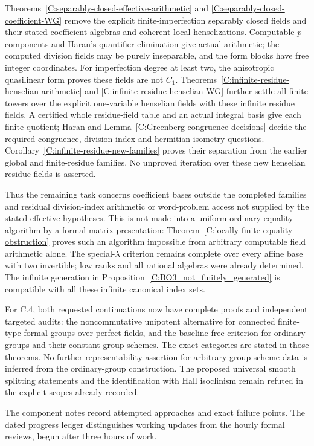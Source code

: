 \begin{remark}
Theorems~\ref{C:separably-closed-effective-arithmetic} and
\ref{C:separably-closed-coefficient-WG} remove the explicit finite-imperfection
separably closed fields and their stated coefficient algebras and
coherent local henselizations. Computable $p$-components and Haran's
quantifier elimination give actual arithmetic; the computed division
fields may be purely inseparable, and the form blocks have free integer
coordinates. For imperfection degree at least two, the anisotropic
quasilinear form proves these fields are not $C_1$.
Theorems~\ref{C:infinite-residue-henselian-arithmetic} and
\ref{C:infinite-residue-henselian-WG} further settle all finite towers over
the explicit one-variable henselian fields with these infinite residue
fields. A certified whole residue-field table and an actual integral
basis give each finite quotient; Haran and
Lemma~\ref{C:Greenberg-congruence-decisions} decide the required
congruence, division-index and hermitian-isometry questions.
Corollary~\ref{C:infinite-residue-new-families} proves their separation
from the earlier global and finite-residue families. No unproved
iteration over these new henselian residue fields is asserted.

Thus the remaining task concerns coefficient bases outside the completed
families and residual division-index arithmetic or word-problem access
not supplied by the stated effective hypotheses. This is not made into a
uniform ordinary equality algorithm by a formal matrix presentation:
Theorem~\ref{C:locally-finite-equality-obstruction} proves such an
algorithm impossible from arbitrary computable field arithmetic alone.
The special-$\lambda$ criterion remains complete over every affine
base with two invertible; low ranks and all rational algebras were
already determined. The infinite generation in
Proposition~\ref{C:BO3_not_finitely_generated} is compatible with
all these infinite canonical index sets.
\end{remark}

For C.4, both requested continuations now have complete proofs and
independent targeted audits: the noncommutative unipotent alternative
for connected finite-type formal groups over perfect fields, and the
baseline-free criterion for ordinary groups and their constant group
schemes. The exact categories are stated in those theorems. No further
representability assertion for arbitrary group-scheme data is inferred
from the ordinary-group construction. The proposed universal smooth
splitting statements and the identification with Hall isoclinism remain
refuted in the explicit scopes already recorded.

The component notes record attempted approaches and exact failure points.
The dated progress ledger distinguishes working updates from the
hourly formal reviews, begun after three hours of work.
